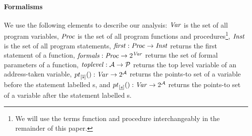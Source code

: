 \paragraph{Formalisms}
We use the following elements to describe our analysis:
$\mathit{Var}$ is the set of all program variables,
$\mathit{Proc}$ is the set of all program functions and procedures\footnote{We
will use the terms function and procedure interchangeably in
the remainder of this paper.},
$\mathit{Inst}$ is the set of all program statements,
$\mathit{first}{}: \mathit{Proc} \rightarrow \mathit{Inst}$ returns the first
statement of a function,
$\mathit{formals}{}: \mathit{Proc} \rightarrow 2^{\mathit{Var}}$ returns the
set of formal parameters of a function, 
$\mathit{toplevel}{}: \mathcal{A} \rightarrow \mathcal{P}$ returns the top level
variable of an address-taken variable,
${pt}_{[\overline{s}] }(): \mathit{Var} \rightarrow 2^\mathcal{A}$ returns the
points-to set of a variable before the statement labelled s,
and ${pt}_{[\underline{s}]}(): \mathit{Var} \rightarrow 2^\mathcal{A}$ returns the
points-to set of a variable after the statement labelled s.
